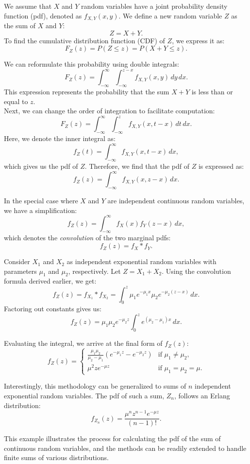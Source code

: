 We assume that \( X \) and \( Y \) random variables have a joint probability density function (pdf), denoted as \( f_{X,Y}(x, y) \). We define a new random variable \( Z \) as the sum of \( X \) and \( Y \):
\[
Z = X + Y.
\]
To find the cumulative distribution function (CDF) of \( Z \), we express it as:
\[
F_Z(z) = P(Z \leq z) = P(X + Y \leq z).
\]

We can reformulate this probability using double integrals:
\[
F_Z(z) = \int_{-\infty}^{\infty} \int_{-\infty}^{z-x} f_{X,Y}(x, y) \, dy \, dx.
\]
This expression represents the probability that the sum \( X + Y \) is less than or equal to \( z \).\\

Next, we can change the order of integration to facilitate computation:
\[
F_Z(z) = \int_{-\infty}^{\infty} \int_{-\infty}^{z} f_{X,Y}(x, t - x) \, dt \, dx.
\]
Here, we denote the inner integral as:
\[
f_Z(t) = \int_{-\infty}^{\infty} f_{X,Y}(x, t - x) \, dx,
\]
which gives us the pdf of \( Z \). Therefore, we find that the pdf of \( Z \) is expressed as:
\[
f_Z(z) = \int_{-\infty}^{\infty} f_{X,Y}(x, z - x) \, dx.
\]

In the special case where \( X \) and \( Y \) are independent continuous random variables, we have a simplification:
\[
f_Z(z) = \int_{-\infty}^{\infty} f_X(x) f_Y(z - x) \, dx,
\]
which denotes the \textit{convolution} of the two marginal pdfs:
\[
f_Z(z) = f_X \ast f_Y.
\]

\begin{example}
Consider \( X_1 \) and \( X_2 \) as independent exponential random variables with parameters \( \mu_1 \) and \( \mu_2 \), respectively. Let \( Z = X_1 + X_2 \). Using the convolution formula derived earlier, we get:
\[
f_Z(z) = f_{X_1} \ast f_{X_2} = \int_0^{z} \mu_1 e^{-\mu_1 x} \mu_2 e^{-\mu_2 (z - x)} \, dx.
\]
Factoring out constants gives us:
\[
f_Z(z) = \mu_1 \mu_2 e^{-\mu_2 z} \int_0^{z} e^{(\mu_2 - \mu_1)x} \, dx.
\]

Evaluating the integral, we arrive at the final form of \( f_Z(z) \):
\[
f_Z(z) = 
\begin{cases}
\frac{\mu_1 \mu_2}{\mu_2 - \mu_1} \left( e^{-\mu_1 z} - e^{-\mu_2 z} \right) & \text{if } \mu_1 \neq \mu_2, \\
\mu^2 z e^{-\mu z} & \text{if } \mu_1 = \mu_2 = \mu.
\end{cases}
\]

Interestingly, this methodology can be generalized to sums of \( n \) independent exponential random variables. The pdf of such a sum, \( Z_n \), follows an Erlang distribution:
\[
f_{Z_n}(z) = \frac{\mu^n z^{n-1} e^{-\mu z}}{(n - 1)!}.
\]

This example illustrates the process for calculating the pdf of the sum of continuous random variables, and the methods can be readily extended to handle finite sums of various distributions.

\end{example}


